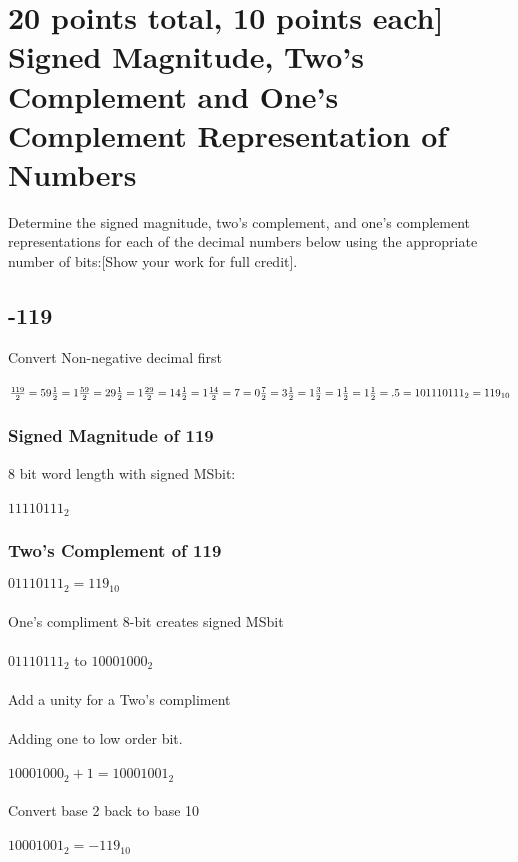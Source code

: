 \documentclass[12pt]{article}
\begin{document}
\section{20 points total, 10 points each] Signed Magnitude, Two's Complement and One's Complement Representation of Numbers}
Determine the signed magnitude, two's complement, and one's complement representations for each of the decimal numbers below using the appropriate number of bits:[Show your work for full credit].
\subsection{-119}
Convert Non-negative decimal first\\ \\
$\frac{119}{2} = 59\frac{1}{2} = 1 \\ \\
\frac{59}{2} = 29\frac{1}{2} = 1 \\ \\
\frac{29}{2} = 14\frac{1}{2} = 1 \\ \\
\frac{14}{2} = 7 = 0 \\ \\
\frac{7}{2} = 3\frac{1}{2} = 1 \\ \\
\frac{3}{2} = 1\frac{1}{2} = 1 \\ \\
\frac{1}{2} = .5 = 1 \\ \\
01110111_2 = 119_{10}$
\subsubsection{Signed Magnitude of 119}
8 bit word length with signed MSbit: \\ \\
$11110111_2$
\subsubsection{Two's Complement of 119}
$01110111_2 = 119_{10}$ \\ \\
One's compliment 8-bit creates signed MSbit\\ \\
$01110111_2$ to $10001000_2$ \\ \\
Add a unity for a Two's compliment\\ \\
Adding one to low order bit. \\ \\
$10001000_2 + 1 = 10001001_2$ \\ \\
Convert base 2 back to base 10 \\ \\
$10001001_2 = -119_{10}$ \\ \\
\end{document}
